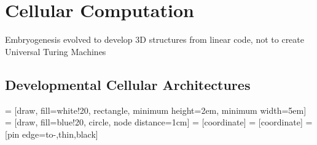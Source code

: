 \section{Cellular Computation}

Embryogenesis evolved to develop 3D structures from linear code, not to create
Universal Turing Machines

\subsection{Developmental Cellular Architectures}

 = [draw, fill=white!20, rectangle, 
    minimum height=2em, minimum width=5em]
 = [draw, fill=blue!20, circle, node distance=1cm]
 = [coordinate]
 = [coordinate]
 = [pin edge={to-,thin,black}]
